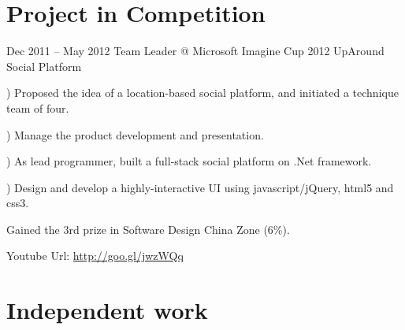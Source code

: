 \documentclass{tccv}
\begin{document}
\section{Project in Competition}
\begin{eventlist}

\item{Dec 2011 -- May 2012}
     {Team Leader @ Microsoft Imagine Cup 2012}
     {UpAround Social Platform}
     
     ) Proposed the idea of a location-based social platform, and initiated a technique team of four.
     
     ) Manage the product development and presentation.
     
     ) As lead programmer, built a full-stack social platform on .Net framework. 
     
     ) Design and develop a highly-interactive UI using javascript/jQuery, html5 and css3.
     
Gained the 3rd prize in Software Design China Zone (6\%).   

Youtube Url: \underline{http://goo.gl/jwzWQq}
       
\end{eventlist}

















\section{Independent work}
\end{document}
